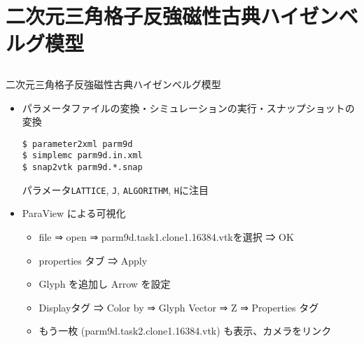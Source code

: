 \section{二次元三角格子反強磁性古典ハイゼンベルグ模型}
\subsection*{\redb\whiteb\greenm}

\begin{frame}[t,fragile]{二次元三角格子反強磁性古典ハイゼンベルグ模型}
  \begin{itemize}
  \item パラメータファイルの変換・シミュレーションの実行・スナップショットの変換
\begin{lstlisting}
$ parameter2xml parm9d
$ simplemc parm9d.in.xml
$ snap2vtk parm9d.*.snap
\end{lstlisting}
パラメータ\verb+LATTICE+, \verb+J+, \verb+ALGORITHM+, \verb+H+に注目
  \item ParaView による可視化
    \begin{itemize}
      \item file ⇒ open ⇒ parm9d.task1.clone1.16384.vtkを選択 ⇒  OK
      \item properties タブ ⇒ Apply
      \item Glyph を追加し Arrow を設定
      \item Displayタグ ⇒ Color by ⇒ Glyph Vector ⇒ Z ⇒ Properties タグ
      \item もう一枚 (parm9d.task2.clone1.16384.vtk) も表示、カメラをリンク
    \end{itemize}
  \end{itemize}
\end{frame}


